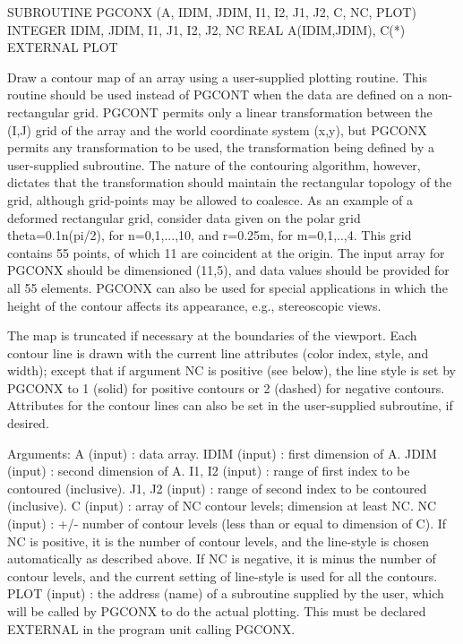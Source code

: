 {\eightpoint\begintt
      SUBROUTINE PGCONX (A, IDIM, JDIM, I1, I2, J1, J2, C, NC, PLOT)
      INTEGER  IDIM, JDIM, I1, J1, I2, J2, NC
      REAL     A(IDIM,JDIM), C(*)
      EXTERNAL PLOT
 
Draw a contour map of an array using a user-supplied plotting
routine.  This routine should be used instead of PGCONT when the
data are defined on a non-rectangular grid.  PGCONT permits only
a linear transformation between the (I,J) grid of the array
and the world coordinate system (x,y), but PGCONX permits any
transformation to be used, the transformation being defined by a
user-supplied subroutine. The nature of the contouring algorithm,
however, dictates that the transformation should maintain the
rectangular topology of the grid, although grid-points may be
allowed to coalesce.  As an example of a deformed rectangular
grid, consider data given on the polar grid theta=0.1n(pi/2),
for n=0,1,...,10, and r=0.25m, for m=0,1,..,4. This grid
contains 55 points, of which 11 are coincident at the origin.
The input array for PGCONX should be dimensioned (11,5), and
data values should be provided for all 55 elements.  PGCONX can
also be used for special applications in which the height of the
contour affects its appearance, e.g., stereoscopic views.
 
The map is truncated if necessary at the boundaries of the viewport.
Each contour line is drawn with the current line attributes (color
index, style, and width); except that if argument NC is positive
(see below), the line style is set by PGCONX to 1 (solid) for
positive contours or 2 (dashed) for negative contours. Attributes
for the contour lines can also be set in the user-supplied
subroutine, if desired.
 
Arguments:
 A      (input) : data array.
 IDIM   (input) : first dimension of A.
 JDIM   (input) : second dimension of A.
 I1, I2 (input) : range of first index to be contoured (inclusive).
 J1, J2 (input) : range of second index to be contoured (inclusive).
 C      (input) : array of NC contour levels; dimension at least NC.
 NC     (input) : +/- number of contour levels (less than or equal
                  to dimension of C). If NC is positive, it is the
                  number of contour levels, and the line-style is
                  chosen automatically as described above. If NC is
                  negative, it is minus the number of contour
                  levels, and the current setting of line-style is
                  used for all the contours.
 PLOT   (input) : the address (name) of a subroutine supplied by
                  the user, which will be called by PGCONX to do
                  the actual plotting. This must be declared
                  EXTERNAL in the program unit calling PGCONX.
 
}

